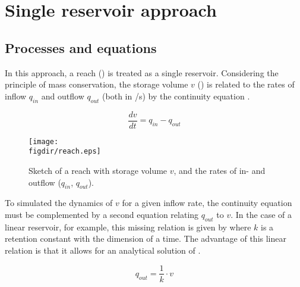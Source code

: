
\section{Single reservoir approach} \label{sec:chanFlow_singleRes}


\subsection{Processes and equations} \label{sec:chanFlow_singleRes_processes}

In this approach, a reach () is treated as a single reservoir. Considering the principle of mass conservation, the storage volume $v$ (\cbm) is related to the rates of inflow $q_{in}$ and outflow $q_{out}$ (both in \cbm/s) by the continuity equation .

\begin{equation} \label{eqn:chanFlow_singleRes_continuity_QinConst}
  \frac{dv}{dt} = q_{in} - q_{out}
\end{equation}

\begin{figure}
  \centering
  \texttt{[image: \\figdir/reach.eps]}
  \caption{Sketch of a reach with storage volume $v$, and the rates of in- and outflow ($q_{in}$, $q_{out}$). \label{fig:chanFlow_singleRes_reach}}
\end{figure}

To simulated the dynamics of $v$ for a given inflow rate, the continuity equation must be complemented by a second equation relating $q_{out}$ to $v$. In the case of a linear reservoir, for example, this missing relation is given by  where $k$ is a retention constant with the dimension of a time. The advantage of this linear relation is that it allows for an analytical solution of .

\begin{equation} \label{eqn:chanFlow_singleRes_outflowLinear}
  q_{out}= \frac{1}{k} \cdot v
\end{equation}

